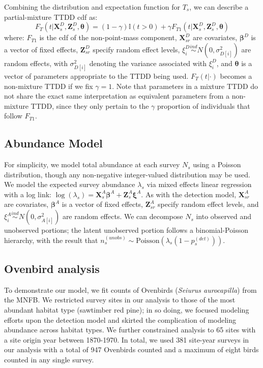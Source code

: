\documentclass[useAMS,usenatbib,referee,12pt]{article}
\begin{document}
Combining the distribution and expectation function for $T_{s}$, we can describe a partial-mixture TTDD cdf as:
\[F_T(t|\textbf{X}_{s}^D, \textbf{Z}_{s}^D, \boldsymbol{\theta}) = (1-\gamma)\mathbb{I}(t>0) + \gamma F_{T1}(t|\textbf{X}_{s}^D, \textbf{Z}_{s}^D, \boldsymbol{\theta})\]
where: $F_{T1}$ is the cdf of the non-point-mass component, $\textbf{X}_{sr}^D$ are covariates, $\boldsymbol{\beta}^D$ is a vector of fixed effects, $\textbf{Z}_{sr}^D$ specify random effect levels, $\xi_i^D \overset{ind}{\sim} N(0,\sigma_{D[i]}^2)$ are random effects, with $\sigma_{D[i]}^2$ denoting the variance associated with $\xi_i^D$, and $\boldsymbol{\theta}$ is a vector of parameters appropriate to the TTDD being used.  
$F_T(t|\cdot)$ becomes a non-mixture TTDD if we fix $\gamma=1$.
Note that parameters in a mixture TTDD do not share the exact same interpretation as equivalent parameters from a non-mixture TTDD, since they only pertain to the $\gamma$ proportion of individuals that follow $F_{T1}$.




\subsection{Abundance Model}

For simplicity, we model total abundance at each survey $N_{s}$ using a Poisson distribution, though any non-negative integer-valued distribution may be used.  
We model the expected survey abundance $\lambda_{s}$ via mixed effects linear regression with a log link: $\log (\lambda_{s}) = \textbf{X}_{s}^A\boldsymbol{\beta}^A + \textbf{Z}_{s}^A\boldsymbol{\xi}^A$.  As with the detection model, $\textbf{X}_{sr}^A$ are covariates, $\boldsymbol{\beta}^A$ is a vector of fixed effects, $\textbf{Z}_{sr}^A$ specify random effect levels, and $\xi_i^A \overset{ind}{\sim} N(0,\sigma_{A[i]}^2)$ are random effects.  
We can decompose $N_{s}$ into observed and unobserved portions; the latent unobserved portion follows a binomial-Poisson hierarchy, with the result that $n_{s}^{(unobs)} \sim \mbox{Poisson}\left(\lambda_{s}(1-p_{s}^{(det)})\right)$.  




\subsection{Ovenbird analysis}\label{sec:ovenbirdanalysis}
To demonstrate our model, we fit counts of Ovenbirds (\textit{Seiurus aurocapilla}) from the MNFB.
We restricted survey sites in our analysis to those of the most abundant habitat type (sawtimber red pine); in so doing, we focused modeling efforts upon the detection model and skirted the complication of modeling abundance across habitat types.  
We further constrained analysis to 65 sites with a site origin year between 1870-1970.  
In total, we used 381 site-year surveys in our analysis with a total of 947 Ovenbirds counted and a maximum of eight birds counted in any single survey.
\end{document}
